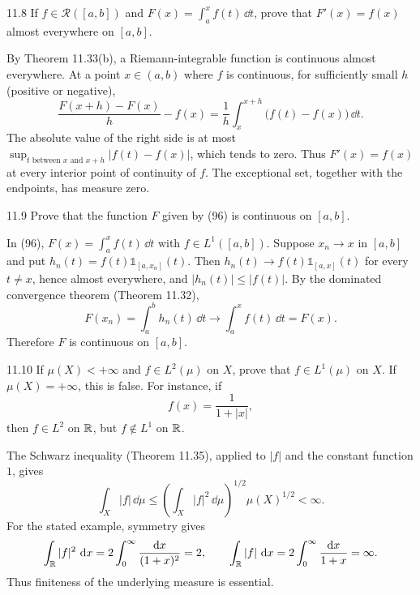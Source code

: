 \documentclass[11pt,oneside]{article}
\begin{document}
\begin{exercise}{11.8}
If $f\in\mathcal R([a,b])$ and $F(x)=\int_a^x f(t)\,\dd t$, prove that $F'(x)=f(x)$ almost everywhere on $[a,b]$.
\end{exercise}
\begin{solution}
By Theorem 11.33(b), a Riemann-integrable function is continuous almost everywhere. At a point $x\in(a,b)$ where $f$ is continuous, for sufficiently small $h$ (positive or negative),
\[
 \frac{F(x+h)-F(x)}h-f(x)
 =\frac1h\int_x^{x+h}\bigl(f(t)-f(x)\bigr)\,\dd t.
\]
The absolute value of the right side is at most
$\sup_{t\text{ between }x\text{ and }x+h}|f(t)-f(x)|$, which tends to zero. Thus $F'(x)=f(x)$ at every interior point of continuity of $f$. The exceptional set, together with the endpoints, has measure zero.
\end{solution}

\begin{exercise}{11.9}
Prove that the function $F$ given by (96) is continuous on $[a,b]$.
\end{exercise}
\begin{solution}
In (96), $F(x)=\int_a^x f(t)\,\dd t$ with $f\in L^1([a,b])$. Suppose $x_n\to x$ in $[a,b]$ and put
$h_n(t)=f(t)\mathds{1}_{[a,x_n]}(t)$. Then $h_n(t)\to f(t)\mathds{1}_{[a,x]}(t)$ for every $t\ne x$, hence almost everywhere, and $|h_n(t)|\le|f(t)|$. By the dominated convergence theorem (Theorem 11.32),
\[
 F(x_n)=\int_a^b h_n(t)\,\dd t\longrightarrow
 \int_a^x f(t)\,\dd t=F(x).
\]
Therefore $F$ is continuous on $[a,b]$.
\end{solution}

\begin{exercise}{11.10}
If $\mu(X)<+\infty$ and $f\in L^2(\mu)$ on $X$, prove that $f\in L^1(\mu)$ on $X$. If $\mu(X)=+\infty$, this is false. For instance, if
\[
 f(x)=\frac1{1+|x|},
\]
then $f\in L^2$ on $\mathbb{R}$, but $f\notin L^1$ on $\mathbb{R}$.
\end{exercise}
\begin{solution}
The Schwarz inequality (Theorem 11.35), applied to $|f|$ and the constant function $1$, gives
\[
 \int_X|f|\,\dd\mu
 \le\left(\int_X|f|^2\,\dd\mu\right)^{1/2}
      \mu(X)^{1/2}<\infty.
\]
For the stated example, symmetry gives
\[
 \int_{\mathbb{R}}|f|^2\,\mathop{}\!\mathrm{d} x
 =2\int_0^\infty\frac{\mathop{}\!\mathrm{d} x}{(1+x)^2}=2,
 \qquad
 \int_{\mathbb{R}}|f|\,\mathop{}\!\mathrm{d} x
 =2\int_0^\infty\frac{\mathop{}\!\mathrm{d} x}{1+x}=\infty.
\]
Thus finiteness of the underlying measure is essential.
\end{solution}
\end{document}
